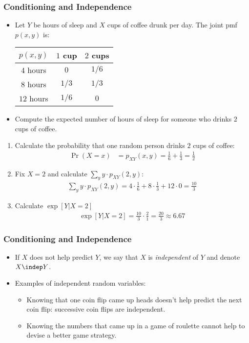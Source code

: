 \begin{frame}
\frametitle{Conditioning and Independence} 
\begin{itemize}
\item Let $Y$ be hours of sleep and $X$ cups of coffee drunk per day. The joint pmf $p(x,y)$ is:
\begin{center}
\begin{tabular}{ccc}
\toprule
$p(x,y)$   & $1$ cup & $2$ cups\\
\midrule
$4$ hours  & $0$     & $1/6$ \\
$8$ hours  & $1/3$   & $1/3$ \\
$12$ hours & $1/6$   & $0$ \\
\bottomrule
\end{tabular}
\end{center}
\item Compute the expected number of hours of sleep for someone who drinks $2$ cups of coffee. 
\end{itemize}
\begin{enumerate}
\item Calculate the probability that one random person drinks $2$ cups of coffee:
\begin{align*}
\Pr(X=x) 
    & = p_{XY}(x,y) 
      = \frac{1}{6} + \frac{1}{3} 
      = \frac{1}{2} 
\end{align*}
\item Fix $X=2$ and calculate $\sum_y y\cdot p_{XY}(2,y)$:
\begin{align*}
\sum_y y \cdot p_{XY}(2,y) 
    = 4\cdot \frac{1}{6} + 8\cdot\frac{1}{3} + 12\cdot 0 
    = \frac{10}{3}   
\end{align*} 
\item Calculate $\exp[Y|X=2]$ \vspace*{-2ex}
\begin{align*}
\exp[Y|X=2] 
  = \frac{10}{3}\cdot\frac{2}{1} 
  = \frac{20}{3} 
\approx 6.67
\end{align*} 
\end{enumerate}
\end{frame}


\begin{frame}
\frametitle{Conditioning and Independence} 
\begin{itemize}
\item If $X$ does not help predict $Y$, we say that $X$ is \emph{independent} of $Y$ and denote $X\indep Y$.
\item Examples of independent random variables:
\begin{itemize}
\item Knowing that one coin flip came up heads doesn't help predict the next coin flip: successive coin flips are independent.
\item Knowing the numbers that came up in a game of roulette cannot help to devise a better game strategy.
\end{itemize}
\end{itemize}
\end{frame}


